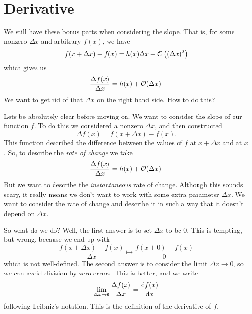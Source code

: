 
\section{Derivative}
\M
We still have these bonus parts when considering the slope. That
is, for some nonzero $\Delta x$ and arbitrary $f(x)$, we have
\begin{equation}
f(x+\Delta x)-f(x)=h(x)\Delta x+\mathcal{O}\left((\Delta x)^{2}\right)
\end{equation}
which gives us
\begin{equation}
\frac{\Delta f(x)}{\Delta x}=h(x)+\mathcal{O}(\Delta x).
\end{equation}
We want to get rid of that $\Delta x$ on the right hand side. How
to do this?

Lets be absolutely clear before moving on. We want to consider
the slope of our function $f$. To do this we considered a nonzero
$\Delta x$, and then constructed
\begin{equation}
\Delta f(x)=f(x+\Delta x)-f(x).
\end{equation}
This function described the difference between the values of $f$
at $x+\Delta x$ and at $x$. So, to describe the \emph{rate of change}
we take
\begin{equation}
\frac{\Delta f(x)}{\Delta x}= h(x)+\mathcal{O}(\Delta x).
\end{equation}
But we want to describe the \emph{instantaneous} rate of
change. Although this sounds scary, it really means we don't want
to work with some extra parameter $\Delta x$. We want to consider
the rate of change and describe it in such a way that it doesn't
depend on $\Delta x$.

So what do we do? Well, the first answer is to set $\Delta x$ to
be 0. This is tempting, but wrong, because we end up with
\begin{equation}
\frac{f(x+\Delta x)-f(x)}{\Delta x}\mapsto \frac{f(x+0)-f(x)}{0}
\end{equation}
which is not well-defined. The second answer is to consider the
limit $\Delta x\to 0$, so we can avoid division-by-zero
errors. This is better, and we write
\begin{equation}
\lim_{\Delta x\to 0}\frac{\Delta f(x)}{\Delta x}=\frac{\mathrm{d} f(x)}{\mathrm{d} x}
\end{equation}
following Leibniz's notation. This is the definition of the
derivative of $f$.

